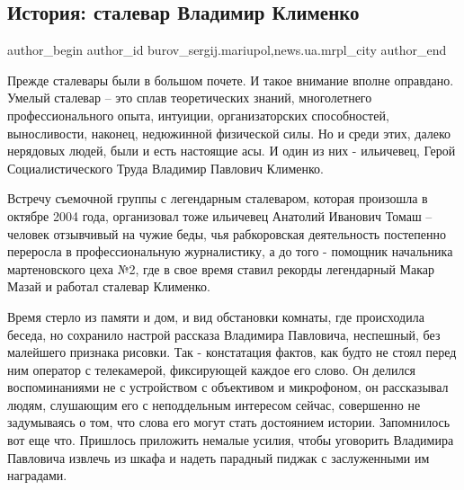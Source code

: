  
 
 
 
 
 
\subsection{История: сталевар Владимир Клименко}
\label{sec:25_03_2017.stz.news.ua.mrpl_city.1.istoria_stalevar_vladimir_klimenko}
 
\ifcmt
 author_begin
   author_id burov_sergij.mariupol,news.ua.mrpl_city
 author_end
\fi

Прежде сталевары были в большом почете. И такое внимание вполне оправдано.
Умелый сталевар – это сплав теоретических знаний, многолетнего
профессионального опыта, интуиции, организаторских способностей, выносливости,
наконец, недюжинной физической силы. Но и среди этих, далеко нерядовых людей,
были и есть настоящие асы. И один из них - ильичевец, Герой Социалистического
Труда Владимир Павлович Клименко.


Встречу съемочной группы с легендарным сталеваром, которая произошла в октябре
2004 года, организовал тоже ильичевец Анатолий Иванович Томаш – человек
отзывчивый на чужие беды, чья рабкоровская деятельность постепенно переросла в
профессиональную журналистику,  а до того - помощник начальника мартеновского
цеха №2, где в свое время ставил рекорды легендарный Макар Мазай и работал
сталевар Клименко.

Время стерло из памяти и дом, и вид обстановки комнаты, где происходила беседа,
но сохранило настрой рассказа Владимира Павловича, неспешный, без малейшего
признака рисовки. Так - констатация фактов, как будто не стоял перед ним
оператор с телекамерой, фиксирующей каждое его слово. Он делился воспоминаниями
не с устройством с объективом и микрофоном, он рассказывал людям, слушающим его
с неподдельным интересом сейчас, совершенно не задумываясь о том, что слова его
могут стать достоянием истории. Запомнилось вот еще что. Пришлось приложить
немалые усилия, чтобы уговорить Владимира Павловича извлечь из шкафа и надеть
парадный пиджак с заслуженными им наградами.

